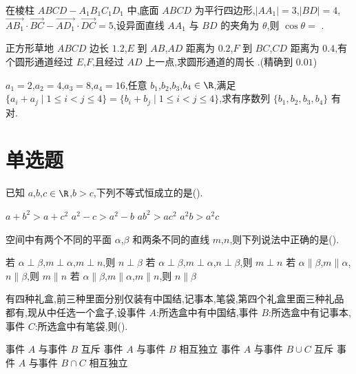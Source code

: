 \begin{problem}
在棱柱 \(ABCD-A_1B_1C_1D_1\) 中,底面 \(ABCD\) 为平行四边形,\(\left|AA_1\right|=3\),\(\left|BD\right|=4\),\(\overrightarrow{AB_1}\cdot\overrightarrow{BC}-\overrightarrow{AD_1}\cdot\overrightarrow{DC}=5\),设异面直线 \(AA_1\) 与 \(BD\) 的夹角为 \(\theta\),则 \(\cos\theta=\)\fillinblank{} .
\end{problem}

\begin{problem}
正方形草地 \(ABCD\) 边长 \(1.2\),\(E\) 到 \(AB\),\(AD\) 距离为 \(0.2\),\(F\) 到 \(BC\),\(CD\) 距离为 \(0.4\),有个圆形通道经过 \(E\),\(F\),且经过 \(AD\) 上一点,求圆形通道的周长\fillinblank{} .(精确到 \(0.01\))

\end{problem}

\begin{problem}
\(a_1=2\),\(a_2=4\),\(a_3=8\),\(a_4=16\),任意 \(b_1\),\(b_2\),\(b_3\),\(b_4\in \R\),满足 \(\{a_i+a_j\mid 1\le i<j\le 4\}=\{b_i+b_j\mid 1\le i<j\le 4\}\),求有序数列 \(\{b_1,b_2,b_3,b_4\}\) 有\fillinblank{} 对.
\end{problem}

\section{单选题}

\begin{problem}
已知 \(a\),\(b\),\(c\in \R\),\(b>c\),下列不等式恒成立的是(\quad).

\choices
    {\(a+b^2>a+c^2\)}
    {\(a^2-c>a^2-b\)}
    {\(ab^2>ac^2\)}
    {\(a^2b>a^2c\)}
\end{problem}

\begin{problem}
空间中有两个不同的平面 \(\alpha\),\(\beta\) 和两条不同的直线 \(m\),\(n\),则下列说法中正确的是(\quad).

\choices
    {若 \(\alpha\perp\beta\),\(m\perp\alpha\),\(m\perp n\),则 \(n\perp\beta\)}
    {若 \(\alpha\perp\beta\),\(m\perp\alpha\),\(n\perp\beta\),则 \(m\perp n\)}
    {若 \(\alpha\parallel\beta\),\(m\parallel\alpha\),\(n\parallel\beta\),则 \(m\parallel n\)}
    {若 \(\alpha\parallel\beta\),\(m\parallel\alpha\),\(m\parallel n\),则 \(n\parallel\beta\)}
\end{problem}

\begin{problem}
有四种礼盒,前三种里面分别仅装有中国结,记事本,笔袋,第四个礼盒里面三种礼品都有,现从中任选一个盒子,设事件 \(A\):所选盒中有中国结,事件 \(B\):所选盒中有记事本,事件 \(C\):所选盒中有笔袋,则(\quad).

\choices
    {事件 \(A\) 与事件 \(B\) 互斥}
    {事件 \(A\) 与事件 \(B\) 相互独立}
    {事件 \(A\) 与事件 \(B\cup C\) 互斥}
    {事件 \(A\) 与事件 \(B\cap C\) 相互独立}
\end{problem}

